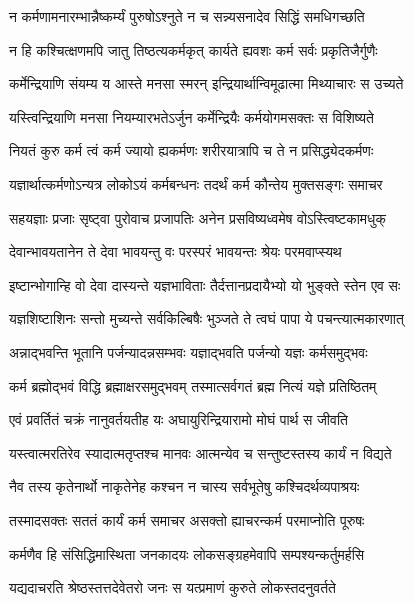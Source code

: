 \twolineshloka
{न कर्मणामनारम्भान्नैष्कर्म्यं पुरुषोऽश्नुते}
{न च सन्न्यसनादेव सिद्धिं समधिगच्छति}%

\twolineshloka
{न हि कश्चित्क्षणमपि जातु तिष्ठत्यकर्मकृत्}
{कार्यते ह्यवशः कर्म सर्वः प्रकृतिजैर्गुणैः}%

\twolineshloka
{कर्मेन्द्रियाणि संयम्य य आस्ते मनसा स्मरन्}
{इन्द्रियार्थान्विमूढात्मा मिथ्याचारः स उच्यते}%

\twolineshloka
{यस्त्विन्द्रियाणि मनसा नियम्यारभतेऽर्जुन}
{कर्मेन्द्रियैः कर्मयोगमसक्तः स विशिष्यते}%

\twolineshloka
{नियतं कुरु कर्म त्वं कर्म ज्यायो ह्यकर्मणः}
{शरीरयात्रापि च ते न प्रसिद्ध्येदकर्मणः}%

\twolineshloka
{यज्ञार्थात्कर्मणोऽन्यत्र लोकोऽयं कर्मबन्धनः}
{तदर्थं कर्म कौन्तेय मुक्तसङ्गः समाचर}%

\twolineshloka
{सहयज्ञाः प्रजाः सृष्ट्वा पुरोवाच प्रजापतिः}
{अनेन प्रसविष्यध्वमेष वोऽस्त्विष्टकामधुक्}%

\twolineshloka
{देवान्भावयतानेन ते देवा भावयन्तु वः}
{परस्परं भावयन्तः श्रेयः परमवाप्स्यथ}%

\twolineshloka
{इष्टान्भोगान्हि वो देवा दास्यन्ते यज्ञभाविताः}
{तैर्दत्तानप्रदायैभ्यो यो भुङ्क्ते स्तेन एव सः}%

\twolineshloka
{यज्ञशिष्टाशिनः सन्तो मुच्यन्ते सर्वकिल्बिषैः}
{भुञ्जते ते त्वघं पापा ये पचन्त्यात्मकारणात्}%

\twolineshloka
{अन्नाद्भवन्ति भूतानि पर्जन्यादन्नसम्भवः}
{यज्ञाद्भवति पर्जन्यो यज्ञः कर्मसमुद्भवः}%

\twolineshloka
{कर्म ब्रह्मोद्भवं विद्धि ब्रह्माक्षरसमुद्भवम्}
{तस्मात्सर्वगतं ब्रह्म नित्यं यज्ञे प्रतिष्ठितम्}%

\twolineshloka
{एवं प्रवर्तितं चक्रं नानुवर्तयतीह यः}
{अघायुरिन्द्रियारामो मोघं पार्थ स जीवति}%

\twolineshloka
{यस्त्वात्मरतिरेव स्यादात्मतृप्तश्च मानवः}
{आत्मन्येव च सन्तुष्टस्तस्य कार्यं न विद्यते}%

\twolineshloka
{नैव तस्य कृतेनार्थो नाकृतेनेह कश्चन}
{न चास्य सर्वभूतेषु कश्चिदर्थव्यपाश्रयः}%

\twolineshloka
{तस्मादसक्तः सततं कार्यं कर्म समाचर}
{असक्तो ह्याचरन्कर्म परमाप्नोति पूरुषः}%

\twolineshloka
{कर्मणैव हि संसिद्धिमास्थिता जनकादयः}
{लोकसङ्ग्रहमेवापि सम्पश्यन्कर्तुमर्हसि}%

\twolineshloka
{यद्यदाचरति श्रेष्ठस्तत्तदेवेतरो जनः}
{स यत्प्रमाणं कुरुते लोकस्तदनुवर्तते}%

